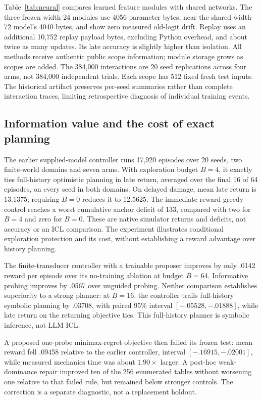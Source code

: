 \documentclass[10pt,twocolumn]{article}
\begin{document}
Table~\ref{tab:neural} compares learned feature modules with shared networks.
The three frozen width-24 modules use 4056 parameter bytes, near the shared
width-72 model's 4040 bytes, and show zero measured old-logit drift. Replay uses
an additional 10,752 replay payload bytes, excluding Python overhead, and about
twice as many updates. Its late
accuracy is slightly higher than isolation. All methods receive authentic
public scope information; module storage grows as scopes are added. The
384,000 interactions are 20 seed replications across four arms, not 384,000
independent trials. Each scope has 512 fixed fresh test inputs. The historical
artifact preserves per-seed summaries rather than complete interaction traces,
limiting retrospective diagnosis of individual training events.

\subsection{Information value and the cost of exact planning}
The earlier supplied-model controller runs 17,920 episodes over 20 seeds, two
finite-world domains and seven arms. With exploration budget $B=4$, it exactly
ties full-history optimistic planning in late return, averaged over the final
16 of 64 episodes, on every seed in both domains. On delayed damage, mean late return is 13.1375; requiring $B=0$ reduces
it to 12.5625. The immediate-reward greedy control reaches a worst cumulative
anchor deficit of 133, compared with two for $B=4$ and zero for $B=0$. These
are native simulator returns and deficits, not accuracy or an ICL comparison.
The experiment illustrates conditional exploration protection and its cost,
without establishing a reward advantage over history planning.

The finite-transducer controller with a trainable proposer improves by only
.0142 reward per episode over its no-training ablation at budget $B=64$.
Informative probing improves by .0567 over unguided probing. Neither comparison
establishes superiority to a strong planner: at $B=16$, the controller trails
full-history symbolic planning by .03708, with paired 95\% interval
$[-.05528,-.01888]$, while late return on the returning objective ties. This
full-history planner is symbolic inference, not LLM ICL.

A proposed one-probe minimax-regret objective then failed its frozen test:
mean reward fell .09458 relative to the earlier controller, interval
$[-.16915,-.02001]$, while measured mechanics time was about $1.90\times$ larger.
A post-hoc weak-dominance repair improved ten of the 256 enumerated tables
without worsening one relative to that failed rule, but remained below stronger
controls. The correction is a separate diagnostic, not a replacement holdout.
\end{document}
